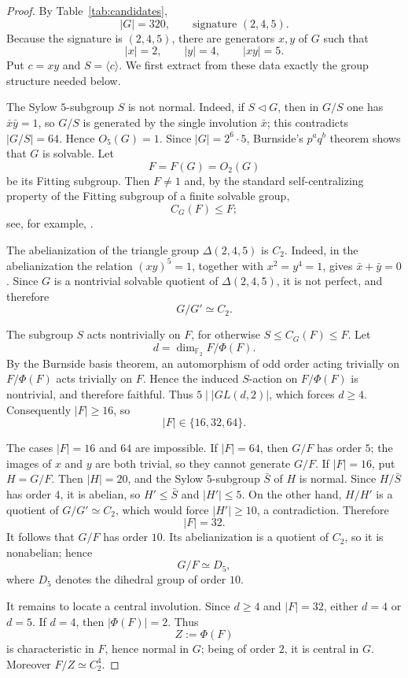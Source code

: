 \documentclass[11pt]{amsart}
\theoremstyle{remark}
\newcommand{\F}{\mathbb F}
\begin{document}
\begin{proof}
By Table~\ref{tab:candidates},
\[
|G|=320,\qquad \text{signature }(2,4,5).
\]
Because the signature is $(2,4,5)$, there are generators $x,y$ of
$G$ such that
\[
 |x|=2,\qquad |y|=4,\qquad |xy|=5.
\]
Put $c=xy$ and $S=\langle c\rangle$. We first extract from these data
exactly the group structure needed below.

The Sylow $5$-subgroup $S$ is not normal. Indeed, if $S\triangleleft G$,
then in $G/S$ one has $\bar x\bar y=1$, so $G/S$ is generated by the
single involution $\bar x$; this contradicts $|G/S|=64$. Hence
$O_5(G)=1$. Since $|G|=2^6\cdot5$, Burnside's $p^a q^b$ theorem shows
that $G$ is solvable. Let
\[
        F=F(G)=O_2(G)
\]
be its Fitting subgroup. Then $F\ne1$ and, by the standard
self-centralizing property of the Fitting subgroup of a finite solvable
group,
\[
        C_G(F)\le F;
\]
see, for example, \cite{Isaacs}.

The abelianization of the triangle group $\Delta(2,4,5)$ is $C_2$.
Indeed, in the abelianization the relation $(xy)^5=1$, together with
$x^2=y^4=1$, gives $\bar x+\bar y=0$. Since $G$ is a nontrivial
solvable quotient of $\Delta(2,4,5)$, it is not perfect, and therefore
\[
        G/G'\simeq C_2.
\]

The subgroup $S$ acts nontrivially on $F$, for otherwise
$S\le C_G(F)\le F$. Let
\[
 d=\dim_{\F_2} F/\Phi(F).
\]
By the Burnside basis theorem, an automorphism of odd order acting
trivially on $F/\Phi(F)$ acts trivially on $F$. Hence the induced
$S$-action on $F/\Phi(F)$ is nontrivial, and therefore faithful. Thus
$5\mid |GL(d,2)|$, which forces $d\ge4$. Consequently
$|F|\ge16$, so
\[
        |F|\in\{16,32,64\}.
\]

The cases $|F|=16$ and $64$ are impossible. If $|F|=64$, then
$G/F$ has order $5$; the images of $x$ and $y$ are both trivial, so
they cannot generate $G/F$. If $|F|=16$, put $H=G/F$. Then
$|H|=20$, and the Sylow $5$-subgroup $\bar S$ of $H$ is normal. Since
$H/\bar S$ has order $4$, it is abelian, so $H'\le\bar S$ and
$|H'|\le5$. On the other hand, $H/H'$ is a quotient of $G/G'\simeq
C_2$, which would force $|H'|\ge10$, a contradiction. Therefore
\[
        |F|=32.
\]
It follows that $G/F$ has order $10$. Its abelianization is a quotient
of $C_2$, so it is nonabelian; hence
\[
        G/F\simeq D_5,
\]
where $D_5$ denotes the dihedral group of order $10$.

It remains to locate a central involution. Since $d\ge4$ and
$|F|=32$, either $d=4$ or $d=5$. If $d=4$, then $|\Phi(F)|=2$.
Thus
\[
        Z:=\Phi(F)
\]
is characteristic in $F$, hence normal in $G$; being of order $2$, it
is central in $G$. Moreover $F/Z\simeq C_2^4$.


\end{proof}
\end{document}
